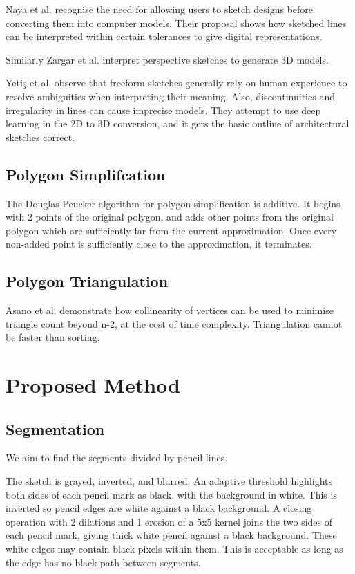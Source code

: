 \documentclass{IEEEtran}
\begin{document}
Naya et al. \cite{naya2002direct} recognise the need for allowing users to sketch designs before converting them into computer models. Their proposal shows how sketched lines can be interpreted within certain tolerances to give digital representations. 

Similarly Zargar et al. \cite{zargar2019introducing} interpret perspective sketches to generate 3D models.

Yetiş et al. \cite{yetics2019auto} observe that freeform sketches generally rely on human experience to resolve ambiguities when interpreting their meaning. Also, discontinuities and irregularity in lines can cause imprecise models. They attempt to use deep learning in the 2D to 3D conversion, and it gets the basic outline of architectural sketches correct.

\subsection{Polygon Simplifcation}

The Douglas-Peucker algorithm \cite{douglas1973algorithms} for polygon simplification is additive. It begins with 2 points of the original polygon, and adds other points from the original polygon which are sufficiently far from the current approximation. Once every non-added point is sufficiently close to the approximation, it terminates.

\subsection{Polygon Triangulation}
Asano et al. \cite{asano1986polygon} demonstrate how collinearity of vertices can be used to minimise triangle count beyond n-2, at the cost of time complexity. Triangulation cannot be faster than sorting. 

\section{Proposed Method}
\subsection{Segmentation}
We aim to find the segments divided by pencil lines.

The sketch is grayed, inverted, and blurred. An adaptive threshold highlights both sides of each pencil mark as black, with the background in white. This is inverted so pencil edges are white against a black background. A closing operation with 2 dilations and 1 erosion of a 5x5 kernel joins the two sides of each pencil mark, giving thick white pencil against a black background. These white edges may contain black pixels within them. This is acceptable as long as the edge has no black path between segments.
\end{document}
